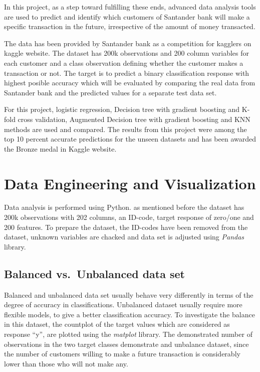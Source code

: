 \documentclass[11pt]{article}
\begin{document}
In this project, as a step toward fulfilling these ends, advanced data
analysis tools are used to predict and identify which customers of
Santander bank will make a specific transaction in the future,
irrespective of the amount of money transacted.

The data has been provided by Santander bank as a competition for
kagglers on kaggle website. The dataset has 200k observations and 200
column variables for each customer and a class observation defining
whether the customer makes a transaction or not. The target is to
predict a binary classification response with highest posible accuracy
which will be evaluated by comparing the real data from Santander bank
and the predicted values for a separate test data set.

For this project, logistic regression, Decision tree with gradient
boosting and K-fold cross validation, Augmented Decision tree with
gradient boosting and KNN methods are used and compared. The results
from this project were among the top 10 percent accurate predictions for
the unseen datasets and has been awarded the Bronze medal in Kaggle
website.

    \hypertarget{data-engineering-and-visualization}{%
\section{Data Engineering and
Visualization}\label{data-engineering-and-visualization}}

    Data analysis is performed using Python. as mentioned before the dataset
has 200k observations with 202 columns, an ID-code, target response of
zero/one and 200 features. To prepare the dataset, the ID-codes have
been removed from the dataset, unknown variables are chacked and data
set is adjusted using \emph{Pandas} library.

    \hypertarget{balanced-vs.unbalanced-data-set}{%
\subsection{Balanced vs.~Unbalanced data
set}\label{balanced-vs.unbalanced-data-set}}

    Balanced and unbalanced data set usually behave very differently in
terms of the degree of accuracy in classifications. Unbalanced dataset
usually require more flexible models, to give a better classification
accuracy. To investigate the balance in this dataset, the countplot of
the target values which are considered as response ``y'', are plotted
using the \emph{matplot} library. The demonstrated number of
observations in the two target classes demonstrate and unbalance
dataset, since the number of customers willing to make a future
transaction is considerably lower than those who will not make any.
\end{document}
